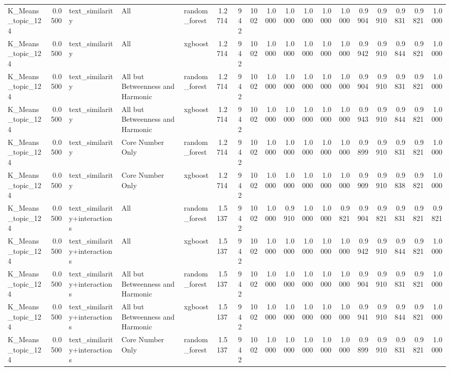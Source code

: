 \begin{tabular}{lrlllrrrrrrrrrrrrr}
K_Means_topic_124 & 0.0500 & text_similarity & All & random_forest & 1.2714 & 942 & 1002 & 1.0000 & 1.0000 & 1.0000 & 1.0000 & 1.0000 & 0.9904 & 0.9910 & 0.9831 & 0.9821 & 1.0000 \\
K_Means_topic_124 & 0.0500 & text_similarity & All & xgboost & 1.2714 & 942 & 1002 & 1.0000 & 1.0000 & 1.0000 & 1.0000 & 1.0000 & 0.9942 & 0.9910 & 0.9844 & 0.9821 & 1.0000 \\
K_Means_topic_124 & 0.0500 & text_similarity & All but Betweenness and Harmonic & random_forest & 1.2714 & 942 & 1002 & 1.0000 & 1.0000 & 1.0000 & 1.0000 & 1.0000 & 0.9904 & 0.9910 & 0.9831 & 0.9821 & 1.0000 \\
K_Means_topic_124 & 0.0500 & text_similarity & All but Betweenness and Harmonic & xgboost & 1.2714 & 942 & 1002 & 1.0000 & 1.0000 & 1.0000 & 1.0000 & 1.0000 & 0.9943 & 0.9910 & 0.9844 & 0.9821 & 1.0000 \\
K_Means_topic_124 & 0.0500 & text_similarity & Core Number Only & random_forest & 1.2714 & 942 & 1002 & 1.0000 & 1.0000 & 1.0000 & 1.0000 & 1.0000 & 0.9899 & 0.9910 & 0.9831 & 0.9821 & 1.0000 \\
K_Means_topic_124 & 0.0500 & text_similarity & Core Number Only & xgboost & 1.2714 & 942 & 1002 & 1.0000 & 1.0000 & 1.0000 & 1.0000 & 1.0000 & 0.9909 & 0.9910 & 0.9838 & 0.9821 & 1.0000 \\
K_Means_topic_124 & 0.0500 & text_similarity+interactions & All & random_forest & 1.5137 & 942 & 1002 & 1.0000 & 0.9910 & 1.0000 & 1.0000 & 0.9821 & 0.9904 & 0.9821 & 0.9831 & 0.9821 & 0.9821 \\
K_Means_topic_124 & 0.0500 & text_similarity+interactions & All & xgboost & 1.5137 & 942 & 1002 & 1.0000 & 1.0000 & 1.0000 & 1.0000 & 1.0000 & 0.9942 & 0.9910 & 0.9844 & 0.9821 & 1.0000 \\
K_Means_topic_124 & 0.0500 & text_similarity+interactions & All but Betweenness and Harmonic & random_forest & 1.5137 & 942 & 1002 & 1.0000 & 1.0000 & 1.0000 & 1.0000 & 1.0000 & 0.9904 & 0.9910 & 0.9831 & 0.9821 & 1.0000 \\
K_Means_topic_124 & 0.0500 & text_similarity+interactions & All but Betweenness and Harmonic & xgboost & 1.5137 & 942 & 1002 & 1.0000 & 1.0000 & 1.0000 & 1.0000 & 1.0000 & 0.9941 & 0.9910 & 0.9844 & 0.9821 & 1.0000 \\
K_Means_topic_124 & 0.0500 & text_similarity+interactions & Core Number Only & random_forest & 1.5137 & 942 & 1002 & 1.0000 & 1.0000 & 1.0000 & 1.0000 & 1.0000 & 0.9899 & 0.9910 & 0.9831 & 0.9821 & 1.0000 \\

\end{tabular}
